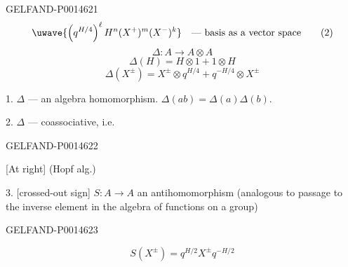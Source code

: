 \begin{GelfandAdjacentEvidence}{GELFAND-P001462}{1}
\begin{equation*}
\text{\uwave{\(\left(q^{H/4}\right)^\ell H^n(X^+)^m(X^-)^k\)}}
\quad\text{--- basis as a vector space}\tag{2}
\end{equation*}
\[
\Delta:A\to A\otimes A
\]
\begin{equation*}
\Delta(H)=H\otimes1+1\otimes H\tag{3}
\end{equation*}
\[
\Delta(X^\pm)=X^\pm\otimes q^{H/4}+q^{-H/4}\otimes X^\pm
\]

1. \(\Delta\) --- an algebra homomorphism. \(\Delta(ab)=\Delta(a)\Delta(b)\).

2. \(\Delta\) --- coassociative, i.e.

\end{GelfandAdjacentEvidence}
\begin{GelfandAdjacentEvidence}{GELFAND-P001462}{2}


[At right] (Hopf alg.)

3. [crossed-out sign] \(S:A\to A\) an antihomomorphism (analogous to passage to the inverse element in the algebra of functions on a group)
\end{GelfandAdjacentEvidence}
\begin{GelfandAdjacentEvidence}{GELFAND-P001462}{3}


\begin{equation*}
S(X^\pm)=q^{H/2}X^\pm q^{-H/2}\tag{4}
\end{equation*}
\end{GelfandAdjacentEvidence}

